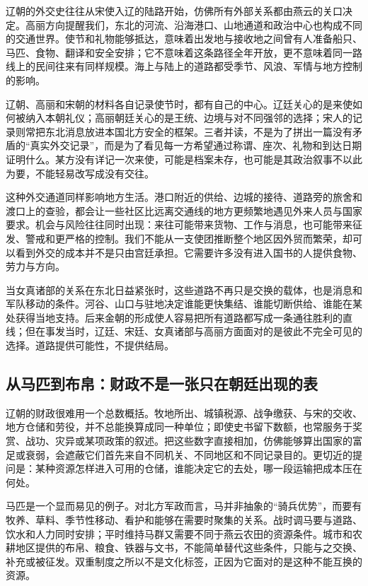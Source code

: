 辽朝的外交史往往从宋使入辽的陆路开始，仿佛所有外部关系都由燕云的关口决定。高丽方向提醒我们，东北的河流、沿海港口、山地通道和政治中心也构成不同的交通世界。使节和礼物能够抵达，意味着出发地与接收地之间曾有人准备船只、马匹、食物、翻译和安全安排；它不意味着这条路径全年开放，更不意味着同一路线上的民间往来有同样规模。海上与陆上的道路都受季节、风浪、军情与地方控制的影响。

辽朝、高丽和宋朝的材料各自记录使节时，都有自己的中心。辽廷关心的是来使如何被纳入本朝礼仪；高丽朝廷关心的是王统、边境与对不同强邻的选择；宋人的记录则常把东北消息放进本国北方安全的框架。三者并读，不是为了拼出一篇没有矛盾的“真实外交记录”，而是为了看见每一方希望通过称谓、座次、礼物和到达日期证明什么。某方没有详记一次来使，可能是档案未存，也可能是其政治叙事不以此为要，不能轻易改写成没有交往。

这种外交通道同样影响地方生活。港口附近的供给、边城的接待、道路旁的旅舍和渡口上的查验，都会让一些社区比远离交通线的地方更频繁地遇见外来人员与国家要求。机会与风险往往同时出现：来往可能带来货物、工作与消息，也可能带来征发、警戒和更严格的控制。我们不能从一支使团推断整个地区因外贸而繁荣，却可以看到外交的成本并不是只由宫廷承担。它需要许多没有进入国书的人提供食物、劳力与方向。

当女真诸部的关系在东北日益紧张时，这些道路不再只是交换的载体，也是消息和军队移动的条件。河谷、山口与驻地决定谁能更快集结、谁能切断供给、谁能在某处获得当地支持。后来金朝的形成使人容易把所有道路都写成一条通往胜利的直线；但在事发当时，辽廷、宋廷、女真诸部与高丽方面面对的是彼此不完全可见的选择。道路提供可能性，不提供结局。

\subsection{从马匹到布帛：财政不是一张只在朝廷出现的表}

辽朝的财政很难用一个总数概括。牧地所出、城镇税源、战争缴获、与宋的交收、地方仓储和劳役，并不总能换算成同一种单位；即使史书留下数额，也常服务于奖赏、战功、灾异或某项政策的叙述。把这些数字直接相加，仿佛能够算出国家的富足或衰弱，会遮蔽它们首先来自不同机关、不同地区和不同记录目的。更切近的提问是：某种资源怎样进入可用的仓储，谁能决定它的去处，哪一段运输把成本压在何处。

马匹是一个显而易见的例子。对北方军政而言，马并非抽象的“骑兵优势”，而要有牧养、草料、季节性移动、看护和能够在需要时聚集的关系。战时调马要与道路、饮水和人力同时安排；平时维持马群又需要不同于燕云农田的资源条件。城市和农耕地区提供的布帛、粮食、铁器与文书，不能简单替代这些条件，只能与之交换、补充或被征发。双重制度之所以不是文化标签，正因为它面对的是这种不能互换的资源。

